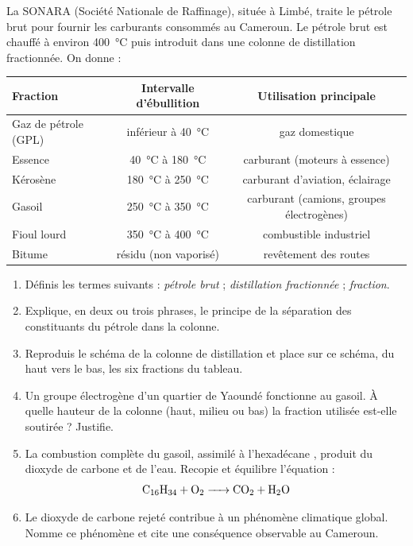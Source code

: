 \documentclass[11pt]{article}
\begin{document}
\begin{exercice}
La SONARA (Société Nationale de Raffinage), située à Limbé, traite le pétrole brut pour fournir les carburants consommés au Cameroun. Le pétrole brut est chauffé à environ \SI{400}{\celsius} puis introduit dans une colonne de distillation fractionnée. On donne :
\begin{center}
\begin{tabular}{|l|c|c|}
\hline
\rowcolor{popblueL} \textbf{Fraction} & \textbf{Intervalle d'ébullition} & \textbf{Utilisation principale} \\
\hline
Gaz de pétrole (GPL) & inférieur à \SI{40}{\celsius} & gaz domestique \\
\hline
Essence & \SI{40}{\celsius} à \SI{180}{\celsius} & carburant (moteurs à essence) \\
\hline
Kérosène & \SI{180}{\celsius} à \SI{250}{\celsius} & carburant d'aviation, éclairage \\
\hline
Gasoil & \SI{250}{\celsius} à \SI{350}{\celsius} & carburant (camions, groupes électrogènes) \\
\hline
Fioul lourd & \SI{350}{\celsius} à \SI{400}{\celsius} & combustible industriel \\
\hline
Bitume & résidu (non vaporisé) & revêtement des routes \\
\hline
\end{tabular}
\end{center}
\begin{enumerate}
\item Définis les termes suivants : \emph{pétrole brut} ; \emph{distillation fractionnée} ; \emph{fraction}.
\item Explique, en deux ou trois phrases, le principe de la séparation des constituants du pétrole dans la colonne.
\item Reproduis le schéma de la colonne de distillation et place sur ce schéma, du haut vers le bas, les six fractions du tableau.
\item Un groupe électrogène d'un quartier de Yaoundé fonctionne au gasoil. À quelle hauteur de la colonne (haut, milieu ou bas) la fraction utilisée est-elle soutirée ? Justifie.
\item La combustion complète du gasoil, assimilé à l'hexadécane , produit du dioxyde de carbone et de l'eau. Recopie et équilibre l'équation :
\[ \ce{C16H34 + O2 -> CO2 + H2O} \]
\item Le dioxyde de carbone rejeté contribue à un phénomène climatique global. Nomme ce phénomène et cite une conséquence observable au Cameroun.
\end{enumerate}
\end{exercice}
\end{document}
